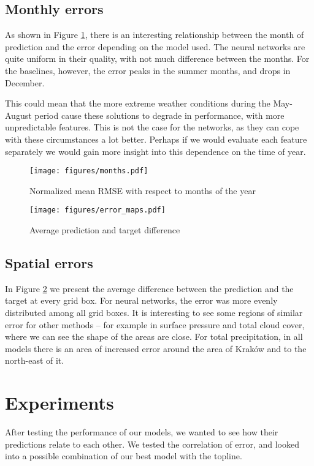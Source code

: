 \subsection{Monthly errors}
As shown in Figure \ref{fig:monthly-error-plot}, there is an interesting relationship between the month of prediction and the error depending on the model used. The neural networks are quite uniform in their quality, with not much difference between the months. For the baselines, however, the error peaks in the summer months, and drops in December.

This could mean that the more extreme weather conditions during the May-August period cause these solutions to degrade in performance, with more unpredictable features. This is not the case for the networks, as they can cope with these circumstances a lot better. Perhaps if we would evaluate each feature separately we would gain more insight into this dependence on the time of year.

\begin{figure}[!ht]
    \centering
    \texttt{[image: figures/months.pdf]}
    \caption{Normalized mean RMSE with respect to months of the year}
    \label{fig:monthly-error-plot}
\end{figure}

\FloatBarrier

\begin{figure}
    \centering
    \texttt{[image: figures/error\_maps.pdf]}
    \caption{Average prediction and target difference}
    \label{fig:error-maps}
\end{figure}

\FloatBarrier

\subsection{Spatial errors}
In Figure \ref{fig:error-maps} we present the average difference between the prediction and the target at every grid box. For neural networks, the error was more evenly distributed among all grid boxes. It is interesting to see some regions of similar error for other methods -- for example in surface pressure and total cloud cover, where we can see the shape of the areas are close. For total precipitation, in all models there is an area of increased error around the area of Kraków and to the north-east of it.



\FloatBarrier

\section{Experiments}\label{chap:exp}
After testing the performance of our models, we wanted to see how their predictions relate to each other. We tested the correlation of error, and looked into a possible combination of our best model with the topline.

